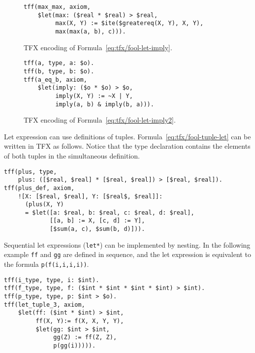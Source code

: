 \begin{figure}[htbp]
\begin{lstlisting}[language=tptp]
tff(max_max, axiom,
    $let(max: ($real * $real) > $real,
         max(X, Y) := $ite($greatereq(X, Y), X, Y),
         max(max(a, b), c))).
\end{lstlisting}
\caption{TFX encoding of Formula~\ref{eq:tfx/fool-let-imply}.}
\label{fig:tfx/let-tfx}
\end{figure}

\begin{figure}[htbp]
\begin{lstlisting}[language=tptp]
tff(a, type, a: $o).
tff(b, type, b: $o).
tff(a_eq_b, axiom,
    $let(imply: ($o * $o) > $o,
         imply(X, Y) := ~X | Y,
         imply(a, b) & imply(b, a))).
\end{lstlisting}
\caption{TFX encoding of Formula~\ref{eq:tfx/fool-let-imply2}.}
\label{fig:tfx/let-tfx2}
\end{figure}


Let expression can use definitions of tuples. 
Formula~\ref{eq:tfx/fool-tuple-let} can be written in TFX as follows. 
Notice that the type declaration contains the elements of both tuples in 
the simultaneous definition.
\begin{lstlisting}[language=tptp]
tff(plus, type,
    plus: ([$real, $real] * [$real, $real]) > [$real, $real]).
tff(plus_def, axiom,
    ![X: [$real, $real], Y: [$real$, $real]]:
      (plus(X, Y) 
      = $let([a: $real, b: $real, c: $real, d: $real],
             [[a, b] := X, [c, d] := Y],
             [$sum(a, c), $sum(b, d)])).
\end{lstlisting}

Sequential let expressions (\verb'let*') can be implemented by nesting. 
In the following example \lstinline'ff' and \lstinline'gg' are defined in sequence, and the let expression is equivalent to the formula \lstinline'p(f(i,i,i,i))'.
\begin{lstlisting}[language=tptp]
tff(i_type, type, i: $int).
tff(f_type, type, f: ($int * $int * $int * $int) > $int).
tff(p_type, type, p: $int > $o).
tff(let_tuple_3, axiom,
    $let(ff: ($int * $int) > $int,
         ff(X, Y):= f(X, X, Y, Y),
         $let(gg: $int > $int,
              gg(Z) := ff(Z, Z),
              p(gg(i))))).
\end{lstlisting}

